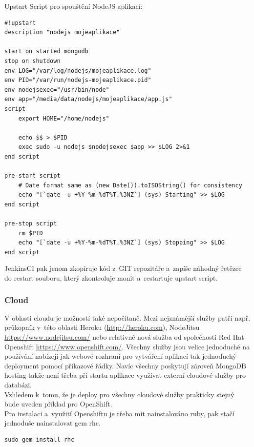 \documentclass[a4paper,12pt,twoside,BCOR=10mm]{article}
\newenvironment{codeframe}{%
  \begin{Sbox} 
    \begin{minipage} 
      {\columnwidth-\leftmargin-\rightmargin-2\fboxsep-2\fboxrule-4pt} 
}{%

  \end{minipage} 
  \end{Sbox} 
  \begin{center} 
    \fcolorbox{black}{codeback}{\TheSbox} 
  \end{center} 
}
\begin{document}
Upstart Script pro spouštění NodeJS aplikací:
\begin{codeframe}
  \begin{verbatim}
#!upstart
description "nodejs mojeaplikace"

start on started mongodb
stop on shutdown
env LOG="/var/log/nodejs/mojeaplikace.log"
env PID="/var/run/nodejs-mojeaplikace.pid"
env nodejsexec="/usr/bin/node"
env app="/media/data/nodejs/mojeaplikace/app.js"
script
    export HOME="/home/nodejs"

    echo $$ > $PID
    exec sudo -u nodejs $nodejsexec $app >> $LOG 2>&1
end script

pre-start script
    # Date format same as (new Date()).toISOString() for consistency
    echo "[`date -u +%Y-%m-%dT%T.%3NZ`] (sys) Starting" >> $LOG
end script

pre-stop script
    rm $PID
    echo "[`date -u +%Y-%m-%dT%T.%3NZ`] (sys) Stopping" >> $LOG
end script
  \end{verbatim}
\end{codeframe}

JenkinsCI pak jenom zkopíruje kód z~GIT repozitáře a~zapíše náhodný řetězec do restart souboru, který zkontroluje monit a~restartuje upstart script.

\subsubsection{Cloud}
V oblasti cloudu je možností také nepočítaně. Mezi nejznámější služby patří např. průkopník v~této oblasti Heroku (\href{http://heroku.com}{http://heroku.com}), NodeJitsu \href{https://www.nodejitsu.com/}{https://www.nodejitsu.com/} nebo relativně nová služba od společnosti Red Hat Openshift \href{https://www.openshift.com/}{https://www.openshift.com/}. Všechny služby jsou velice jednoduché na používání nabízejí jak webové rozhraní pro vytváření aplikací tak jednoduchý deployment pomocí příkazové řádky. Navíc všechny poskytují zároveň MongoDB hosting takže není třeba při startu aplikace využívat externí cloudové služby pro databázi.\\

Vzhledem k~tomu, že je deploy pro všechny cloudové služby prakticky stejný bude uveden příklad pro OpenShift.\\

Pro instalaci a~využití Openshiftu je třeba mít nainstalováno ruby, pak stačí jednoduše nainstalovat gem rhc.
\begin{codeframe}
  \begin{verbatim}
sudo gem install rhc
    \end{verbatim}
\end{codeframe}
\end{document}
